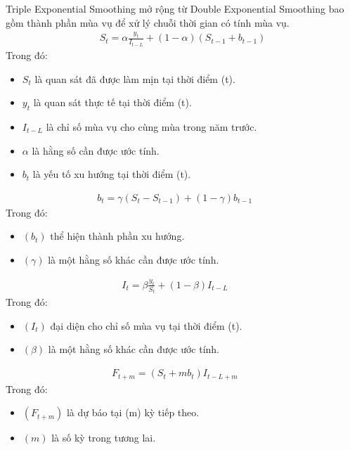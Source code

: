 \documentclass[conference]{IEEEtran}
\begin{document}
Triple Exponential Smoothing mở rộng từ Double Exponential Smoothing bao gồm thành phần mùa vụ để xử lý chuỗi thời gian có tính mùa vụ.\cite{HoltWinter3}
\begin{align*}
    S_t = \alpha \frac{y_t}{I_{t-L}} + (1-\alpha)(S_{t-1}+b_{t-1}) 
\end{align*}
Trong đó:
\begin{itemize}
\item $S_t$ là quan sát đã được làm mịn tại thời điểm (t).
\item $y_t$ là quan sát thực tế tại thời điểm (t).
\item $I_{t-L}$ là chỉ số mùa vụ cho cùng mùa trong năm trước.
\item $\alpha$ là hằng số cần được ước tính.
\item $b_t$ là yếu tố xu hướng tại thời điểm (t).
\end{itemize}
\begin{align*}
b_t = \gamma (S_t - S_{t-1}) + (1 - \gamma)b_{t-1} & &
\end{align*}
Trong đó:
\begin{itemize}
\item $(b_t)$ thể hiện thành phần xu hướng.
\item $(\gamma)$ là một hằng số khác cần được ước tính.
\end{itemize}
\begin{align*}
 I_t = \beta \frac{y_t}{S_t} + (1 - \beta) I_{t-L} & &
\end{align*}
Trong đó:
\begin{itemize}
\item $(I_t)$ đại diện cho chỉ số mùa vụ tại thời điểm (t).
\item $(\beta)$ là một hằng số khác cần được ước tính.
\end{itemize}
\begin{align*}
F_{t+m} = (S_t + m b_t) I_{t-L+m} & &
\end{align*}
Trong đó:
\begin{itemize}
\item $(F_{t+m})$ là dự báo tại (m) kỳ tiếp theo.
\item $(m)$ là số kỳ trong tương lai.
\end{itemize}
\end{document}
